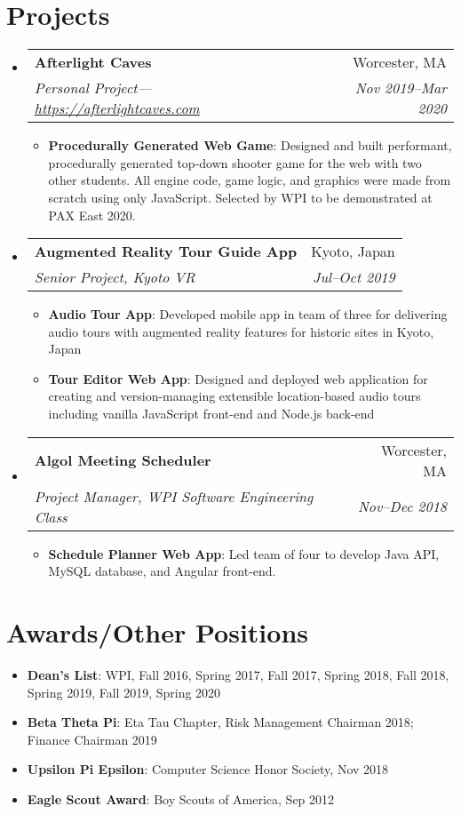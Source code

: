 \documentclass[a4paper,11pt]{article}
\makeatletter
\newcommand{\resumeItem}[2]{
  \item\small{
    \textbf{#1}{: #2 \vspace{-2pt}}
  }
}
\newcommand{\resumeSubheading}[4]{
  \vspace{-1pt}\item
    \begin{tabular*}{0.97\textwidth}{l@{\extracolsep{\fill}}r}
      \textbf{#1} & #2 \\
      \textit{\small#3} & \textit{\small #4} \\
    \end{tabular*}\vspace{-5pt}
}
\newcommand{\resumeSubItem}[2]{\resumeItem{#1}{#2}\vspace{-4pt}}
\newcommand{\resumeSubHeadingListStart}{\begin{itemize}[leftmargin=*]}
\newcommand{\resumeSubHeadingListEnd}{\end{itemize}}
\newcommand{\resumeItemListStart}{\begin{itemize}}
\newcommand{\resumeItemListEnd}{\end{itemize}\vspace{-5pt}}
\makeatother
\begin{document}
\section{Projects}
\resumeSubHeadingListStart
  \resumeSubheading
    {Afterlight Caves}{Worcester, MA}
	{Personal Project---\url{https://afterlightcaves.com}}{Nov 2019--Mar 2020}
	\resumeItemListStart
	\resumeItem{Procedurally Generated Web Game}{Designed and built
		performant, procedurally generated top-down shooter game for the web
		with two other students. All engine code, game logic, and graphics were
		made from scratch using only JavaScript. Selected by WPI to be
		demonstrated at PAX East 2020.}
	\resumeItemListEnd
    \resumeSubheading
	{Augmented Reality Tour Guide App}{Kyoto, Japan}
    {Senior Project, Kyoto VR}{Jul--Oct 2019}
	\resumeItemListStart
	  \resumeItem{Audio Tour App}{Developed mobile app in team of three for
		  delivering audio tours with augmented reality features for historic
		  sites in Kyoto, Japan}
	  \resumeItem{Tour Editor Web App}{Designed and deployed web application for
		  creating and version-managing extensible location-based audio tours
		  including vanilla JavaScript front-end and Node.js back-end}
	\resumeItemListEnd


    \resumeSubheading
	{Algol Meeting Scheduler}{Worcester, MA}
	{Project Manager, WPI Software Engineering Class}{Nov--Dec 2018}
	\resumeItemListStart
    \resumeItem{Schedule Planner Web App}{Led team of four to develop Java API,
      MySQL database, and Angular front-end.}
	\resumeItemListEnd
  \resumeSubHeadingListEnd



\section{Awards/Other Positions}
  \resumeSubHeadingListStart
    \resumeSubItem{Dean's List}
      {WPI, Fall 2016, Spring 2017, Fall 2017, Spring 2018, Fall 2018, Spring
        2019, Fall 2019, Spring 2020}
    \resumeSubItem{Beta Theta Pi}
	{Eta Tau Chapter, Risk Management Chairman 2018; Finance Chairman 2019}
    \resumeSubItem{Upsilon Pi Epsilon}
      {Computer Science Honor Society, Nov 2018}
    \resumeSubItem{Eagle Scout Award}
      {Boy Scouts of America, Sep 2012}
  \resumeSubHeadingListEnd

\end{document}
